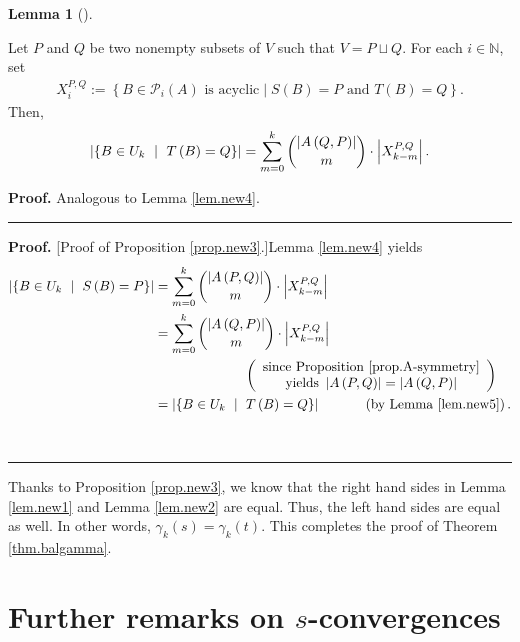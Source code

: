 \documentclass[numbers=enddot,12pt,final,onecolumn,notitlepage]{scrartcl}%
\theoremstyle{definition}
\newtheorem{lem}[theo]{Lemma}
\newenvironment{lemma}[1][]
{\begin{lem}[#1]\begin{leftbar}}
{\end{leftbar}\end{lem}}
\newenvironment{proof}[1][Proof]{\noindent\textbf{#1.} }{\ \rule{0.5em}{0.5em}}
\let\sumnonlimits\sum
\renewcommand{\sum}{\sumnonlimits\limits}
\theoremstyle{plainsl}
\begin{document}
\begin{lemma}
\label{lem.new5}
Let $P$ and $Q$ be two nonempty subsets of $V$ such that
$V=P\sqcup Q$.
For each $i \in \mathbb{N}$, set
\begin{align*}
    X_i^{P,Q} := \left\{B \in \mathcal{P}_i(A) \text{ is acyclic} \mid S(B) = P \text{ and } T(B) = Q\right\}.
\end{align*}
Then,%
\[
\left\vert \left\{  B\in U_{k}\ \mid\ T\left(  B\right)  =Q\right\}
\right\vert =\sum_{m=0}^{k}\dbinom{\left\vert A\left(  Q,P\right)  \right\vert
}{m}\cdot\left\vert X_{k-m}^{P,Q}\right\vert .
\]

\end{lemma}

\begin{proof}
Analogous to Lemma \ref{lem.new4}.
\end{proof}

\begin{proof}
[Proof of Proposition \ref{prop.new3}.]Lemma \ref{lem.new4} yields%
\begin{align*}
\left\vert \left\{  B\in U_{k}\ \mid\ S\left(  B\right)  =P\right\}
\right\vert  &  =\sum_{m=0}^{k}\dbinom{\left\vert A\left(  P,Q\right)
\right\vert }{m}\cdot\left\vert X_{k-m}^{P,Q}\right\vert \\
&  =\sum_{m=0}^{k}\dbinom{\left\vert A\left(  Q,P\right)  \right\vert }%
{m}\cdot\left\vert X_{k-m}^{P,Q}\right\vert \\
&  \ \ \ \ \ \ \ \ \ \ \ \ \ \ \ \ \ \ \ \ \left(
\begin{array}
[c]{c}%
\text{since Proposition \ref{prop.A-symmetry}}\\
\text{yields }\left\vert A\left(  P,Q\right)  \right\vert =\left\vert A\left(
Q,P\right)  \right\vert
\end{array}
\right) \\
&  =\left\vert \left\{  B\in U_{k}\ \mid\ T\left(  B\right)  =Q\right\}
\right\vert \ \ \ \ \ \ \ \ \ \ \left(  \text{by Lemma \ref{lem.new5}}\right)
.
\end{align*}

\end{proof}

Thanks to Proposition \ref{prop.new3}, we know that the right hand sides in
Lemma \ref{lem.new1} and Lemma \ref{lem.new2} are equal. Thus, the left hand
sides are equal as well. In other words, $\gamma_{k}\left(  s\right)
=\gamma_{k}\left(  t\right)  $. This completes the proof of Theorem
\ref{thm.balgamma}.

\section{Further remarks on $s$-convergences}
\end{document}
